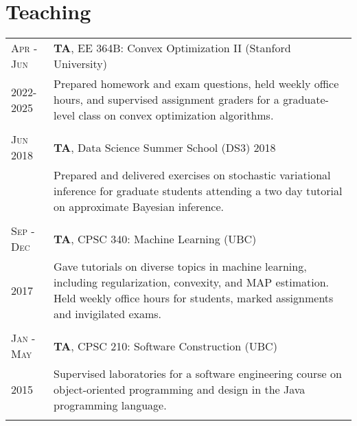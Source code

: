 \documentclass[10pt]{article}
\newcommand{\spacing}{\vspace{0.5cm}}
\begin{document}
\spacing
\spacing

\section{Teaching}
\begin{longtable}
    {R{1.8cm}|L{11.8cm}}
    \textsc{Apr - Jun}      & \textbf{TA}, EE 364B: Convex Optimization II (Stanford University)                                                                                                       \\
    \vspace{0.3cm}2022-2025 & {\small Prepared homework and exam questions, held weekly office hours, and supervised assignment graders for a graduate-level class on convex optimization algorithms.} \\   \\
    \textsc{ Jun 2018}      & \textbf{TA}, Data Science Summer School (DS3) 2018                                                                                                                       \\
                            & {\small Prepared and delivered exercises on stochastic variational inference for graduate students attending a two day tutorial on approximate Bayesian inference.}      \\  \\
    \textsc{Sep - Dec}      & \textbf{TA}, CPSC 340: Machine Learning                          (UBC)                                                                                                   \\
    \vspace{0.7cm} 2017     & {\small Gave tutorials on diverse topics in machine learning, including regularization, convexity, and MAP estimation.
            Held weekly office hours for students, marked assignments and invigilated
            exams.
    }                                                                                                                                                                                                  \\  \\
    \textsc{Jan - May}      & \textbf{TA}, CPSC 210: Software Construction                     (UBC)                                                                                                   \\
    \vspace{0.2cm}2015      & {\small Supervised laboratories for a software engineering course on object-oriented programming and design in the Java programming language.}                           \\  \\

\end{longtable}
\end{document}
